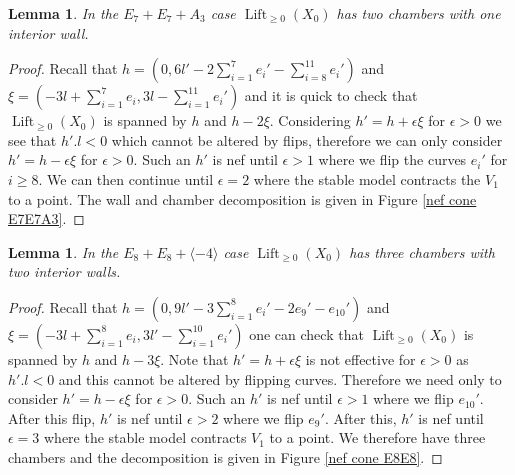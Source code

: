 \documentclass[a4paper]{amsart}
\theoremstyle{definition}
\theoremstyle{plain}
\newtheorem{lemma}[defn]{Lemma}
\theoremstyle{remark}
\begin{document}
\begin{lemma}
In the $E_7+E_7+A_3$ case $\operatorname{Lift}_{\geq 0}(X_0)$ has two chambers with one interior wall.
\end{lemma}

\begin{proof}
Recall that $h=(0,6l'-2\sum_{i=1}^7e_i'-\sum_{i=8}^{11}e_i')$ and $\xi=(-3l+\sum_{i=1}^7e_i,3l-\sum_{i=1}^{11}e_i')$ and it is quick to check that $\operatorname{Lift}_{\geq 0}(X_0)$ is spanned by $h$ and $h-2\xi$. Considering $h'=h+\epsilon\xi$ for $\epsilon >0$ we see that $h'. l <0$ which cannot be altered by flips, therefore we can only consider $h'=h-\epsilon\xi$ for $\epsilon >0$. Such an $h'$ is nef until $\epsilon >1$ where we flip the curves $e_i'$ for $i\geq 8$. We can then continue until $\epsilon =2$ where the stable model contracts the $V_1$ to a point. The wall and chamber decomposition is given in Figure \ref{nef cone E7E7A3}.
\end{proof}

\begin{lemma}\label{lifted polarization E8E8-4}
In the $E_8+E_8+\langle -4\rangle$ case $\operatorname{Lift}_{\geq 0}(X_0)$ has three chambers with two interior walls.
\end{lemma}

\begin{proof}
Recall that $h=(0,9l'-3\sum_{i=1}^8e_i'-2e_9'-e_{10}')$ and $\xi=(-3l+\sum_{i=1}^8e_i,3l'-\sum_{i=1}^{10}e_i')$ one can check that $\operatorname{Lift}_{\geq 0}(X_0)$ is spanned by $h$ and $h-3\xi$. Note that $h'=h+\epsilon\xi$ is not effective for $\epsilon >0$ as $h'. l <0$ and this cannot be altered by flipping curves. Therefore we need only to consider $h'=h-\epsilon\xi$ for $\epsilon >0$.
Such an $h'$ is nef until $\epsilon >1$ where we flip $e_{10}'$. After this flip, $h'$ is nef until $\epsilon >2$ where we flip $e_9'$. After this, $h'$ is nef until $\epsilon =3$ where the stable model contracts $V_1$ to a point. We therefore have three chambers and the decomposition is given in Figure \ref{nef cone E8E8}.
\end{proof}
\end{document}

